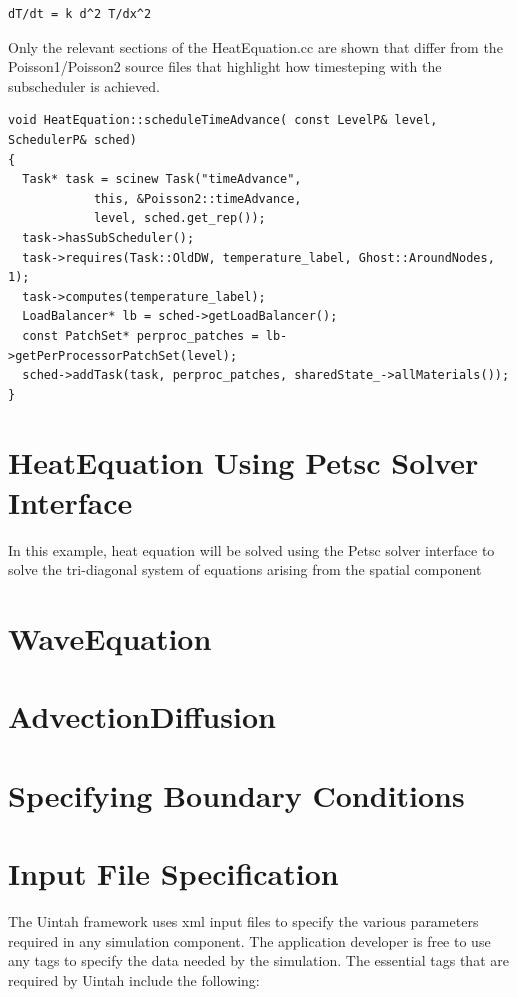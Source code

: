 \documentclass[12pt]{report}
\begin{document}
\begin{Verbatim}[fontsize=\footnotesize]
	dT/dt = k d^2 T/dx^2  
\end{Verbatim}

Only the relevant sections of the HeatEquation.cc are shown that
differ from the Poisson1/Poisson2 source files that highlight how
timesteping with the subscheduler is achieved.

\begin{Verbatim}[fontsize=\footnotesize]
void HeatEquation::scheduleTimeAdvance( const LevelP& level, SchedulerP& sched)
{
  Task* task = scinew Task("timeAdvance",
			this, &Poisson2::timeAdvance,
			level, sched.get_rep());
  task->hasSubScheduler();
  task->requires(Task::OldDW, temperature_label, Ghost::AroundNodes, 1);
  task->computes(temperature_label);
  LoadBalancer* lb = sched->getLoadBalancer();
  const PatchSet* perproc_patches = lb->getPerProcessorPatchSet(level);
  sched->addTask(task, perproc_patches, sharedState_->allMaterials());
}

\end{Verbatim}

\section{HeatEquation Using Petsc Solver Interface}

In this example, heat equation will be solved using the Petsc solver
interface to solve the tri-diagonal system of equations arising from
the spatial component

\section{WaveEquation}

\section{AdvectionDiffusion}

\section{Specifying Boundary Conditions}

\section{Input File Specification}

The Uintah framework uses xml input files to specify the various
parameters required in any simulation component.  The application
developer is free to use any tags to specify the data needed by the
simulation.  The essential tags that are required by Uintah include
the following:
\end{document}
